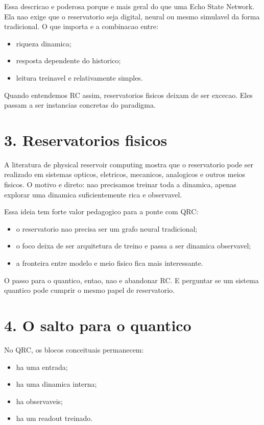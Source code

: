 \documentclass[12pt]{article}
\providecommand{\tightlist}{%
  \setlength{\itemsep}{0pt}\setlength{\parskip}{0pt}}
\begin{document}
Essa descricao e poderosa porque e mais geral do que uma Echo State Network. Ela nao exige que o reservatorio seja digital, neural ou mesmo simulavel da forma tradicional. O que importa e a combinacao entre:

\begin{itemize}
\tightlist
\item
  riqueza dinamica;
\item
  resposta dependente do historico;
\item
  leitura treinavel e relativamente simples.
\end{itemize}

Quando entendemos RC assim, reservatorios fisicos deixam de ser excecao. Eles passam a ser instancias concretas do paradigma.

\section{3. Reservatorios fisicos}\label{3-reservatorios-fisicos}

A literatura de physical reservoir computing mostra que o reservatorio pode ser realizado em sistemas opticos, eletricos, mecanicos, analogicos e outros meios fisicos. O motivo e direto: nao precisamos treinar toda a dinamica, apenas explorar uma dinamica suficientemente rica e observavel.

Essa ideia tem forte valor pedagogico para a ponte com QRC:

\begin{itemize}
\tightlist
\item
  o reservatorio nao precisa ser um grafo neural tradicional;
\item
  o foco deixa de ser arquitetura de treino e passa a ser dinamica observavel;
\item
  a fronteira entre modelo e meio fisico fica mais interessante.
\end{itemize}

O passo para o quantico, entao, nao e abandonar RC. E perguntar se um sistema quantico pode cumprir o mesmo papel de reservatorio.

\section{4. O salto para o quantico}\label{4-o-salto-para-o-quantico}

No QRC, os blocos conceituais permanecem:

\begin{itemize}
\tightlist
\item
  ha uma entrada;
\item
  ha uma dinamica interna;
\item
  ha observaveis;
\item
  ha um readout treinado.
\end{itemize}
\end{document}
